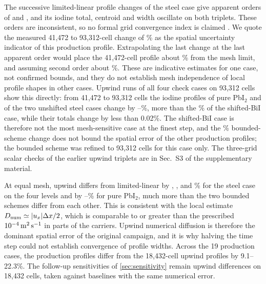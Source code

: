 The successive limited-linear profile changes of the steel case give
apparent orders of \SteelOrderOne{} and \SteelOrderTwo, and its iodine
total, centroid and width oscillate on both triplets. These orders are
inconsistent, so no formal grid convergence index is claimed
\cite{NASAGridConvergence,Roache1994perspective,Celik2008procedure}. We
quote the measured 41,472 to 93,312-cell change of \SteelLLThree\% as the
spatial uncertainty indicator of this production profile. Extrapolating
the last change at the last apparent order would place the 41,472-cell
profile about \SteelErrApparent\% from the mesh limit, and assuming
second order about \SteelErrSecond\%. These are indicative estimates for
one case, not confirmed bounds, and they do not establish mesh
independence of local profile shapes in other cases. Upwind runs of all
four check cases on 93,312 cells show this directly: from 41,472 to
93,312 cells the iodine profiles of pure PbI$_2$ and of the two
unshifted steel cases change by \UpFourOthersMin--\UpFourOthersMax\%,
more than the \SteelUpThree\% of the shifted-BiI case, while their
totals change by less than 0.02\%. The shifted-BiI case is therefore
not the most mesh-sensitive case at the finest step, and the
\SteelLLThree\% bounded-scheme change does not bound the spatial error
of the other production profiles; the bounded scheme was refined to
93,312 cells for this case only. The three-grid
scalar checks of the earlier upwind triplets are in Sec.~S3 of the
supplementary material.

At equal mesh, upwind differs from limited-linear by \UpLLOne, \UpLLTwo,
\UpLLThree{} and \UpLLFour\% for the steel case on the four levels and
by \PureUpLLMin--\PureUpLLMax\% for pure PbI$_2$, much more than the two
bounded schemes differ from each other. This is consistent with the
local estimate $D_{\rm num}\simeq|u_x|\Delta x/2$, which is comparable
to or greater than the prescribed $10^{-4}\,\mathrm{m^2\,s^{-1}}$ in parts
of the carriers. Upwind numerical diffusion is therefore the dominant
spatial error of the original campaign, and it is why halving the time
step could not establish convergence of profile widths. Across the 19
production cases, the production profiles differ from the 18,432-cell
upwind profiles by 9.1--22.3\%. The follow-up sensitivities of
\cref{sec:sensitivity} remain upwind differences on 18,432 cells, taken
against baselines with the same numerical error.

